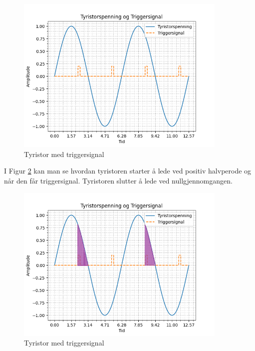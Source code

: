 \begin{question}[name=Spørsmål, topic=tyristor]
	
\begin{figure}[H]
	\centering
	\includegraphics[width=0.9\textwidth]{tyristor/plot/tyristor2.png}
	\caption{Tyristor med triggersignal}
	\label{fig:tyrTriggplot}
\end{figure}
\end{question}

\vspace{0.5cm} %

\begin{solution}[name=Løsningsforslag]
I Figur \ref{fig:tyrTriggplotSOL} kan man se hvordan tyristoren starter å lede ved positiv halvperode og når den får triggersignal. Tyristoren slutter å lede ved nullgjennomgangen.

\begin{figure}[H]
	\centering
	\includegraphics[width=0.9\textwidth]{tyristor/plot/tyristor2SOL.png}
	\caption{Tyristor med triggersignal}
	\label{fig:tyrTriggplotSOL}
\end{figure}

\end{solution}



